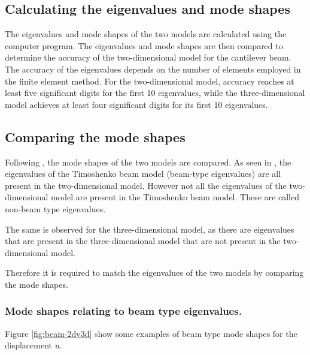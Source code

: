 \begin{figure}[h!]
{{\begin{minipage}[b]{0.7\linewidth}
				
			\end{minipage}
		}
	}
\end{figure}
\FloatBarrier

\subsection{Calculating the eigenvalues and mode shapes}
The eigenvalues and mode shapes of the two models are calculated using the computer program. The eigenvalues and mode shapes are then compared to determine the accuracy of the two-dimensional model for the cantilever beam. The accuracy of the eigenvalues depends on the number of elements employed in the finite element method. For the two-dimensional model, accuracy reaches at least five significant digits for the first 10 eigenvalues, while the three-dimensional model achieves at least four significant digits for its first 10 eigenvalues.

\subsection{Comparing the mode shapes}
Following \cite{LVV09}, the mode shapes of the two models are compared. As seen in \cite{LVV09}, the eigenvalues of the Timoshenko beam model (beam-type eigenvalues) are all present in the two-dimensional model. However not all the eigenvalues of the two-dimensional model are present in the Timoshenko beam model. These are called non-beam type eigenvalues. 

The same is observed for the three-dimensional model, as there are eigenvalues that are present in the three-dimensional model that are not present in the two-dimensional model.

Therefore it is required to match the eigenvalues of the two models by comparing the mode shapes.

\subsubsection*{Mode shapes relating to beam type eigenvalues.}
Figure \ref{fig:beam-2dv3d} show some examples of beam type mode shapes for the displacement $u$.

